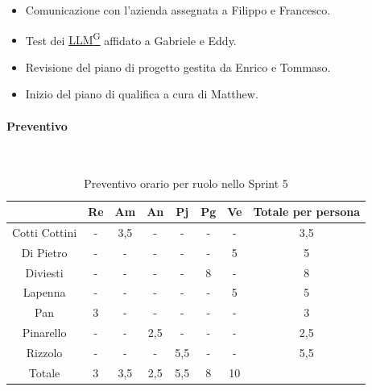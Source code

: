 \documentclass{article}
\begin{document}
\begin{itemize}
\begin{itemize}
                        \item Comunicazione con l'azienda assegnata a Filippo e Francesco.
                        \item Test dei \href{https://code7crusaders.github.io/docs/RTB/documentazione_interna/glossario.html#llm-large-language-model}{LLM\textsuperscript{G}} affidato a Gabriele e Eddy.
                        \item Revisione del piano di progetto gestita da Enrico e Tommaso.
                        \item Inizio del piano di qualifica a cura di Matthew.
                    \end{itemize}
                \end{itemize}

                \paragraph{Preventivo}\mbox{}\\
                \begin{table}[H]
                    \centering
                    \begin{tabular}{|c|c|c|c|c|c|c|c|}
                    \hline
                                  & Re  & Am  & An  & Pj  & Pg  & Ve  & Totale per persona \\ \hline
                    Cotti Cottini & -   & 3,5 & -   & -   & -   & -   & 3,5                \\ \hline
                    Di Pietro     & -   & -   & -   & -   & -   & 5   & 5                  \\ \hline
                    Diviesti      & -   & -   & -   & -   & 8  & -   & 8                 \\ \hline
                    Lapenna       & -   & -   & -   & -   & -   & 5   & 5                  \\ \hline
                    Pan           & 3   & -   & -   & -   & -   & -   & 3                  \\ \hline
                    Pinarello     & -   & -   & 2,5 & -   & -   & -   & 2,5                \\ \hline
                    Rizzolo       & -   & -   & -   & 5,5 & -   & -   & 5,5                \\ \hline
                    Totale        & 3   & 3,5 & 2,5 & 5,5 & 8  & 10  &                    \\ \hline
                    \end{tabular}
                    \caption{Preventivo orario per ruolo nello Sprint 5}
                \end{table}
\end{document}
